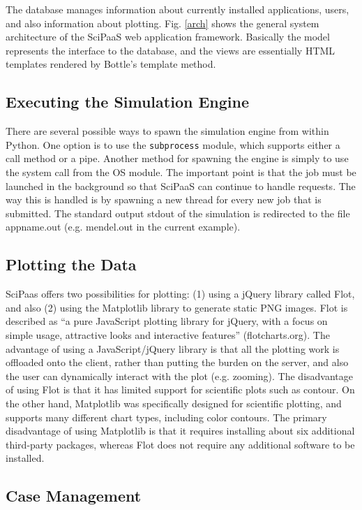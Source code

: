 \documentclass[10pt,reprint]{socc14}
\begin{document}
The database manages information about currently installed applications, users, and also information about plotting.  Fig. \ref{arch} shows the general system architecture of the SciPaaS web application framework. Basically the model represents the interface to the database, and the views are essentially HTML templates rendered by Bottle’s template method.

\subsection{Executing the Simulation Engine}

There are several possible ways to spawn the simulation engine from within Python.  One option is to use the \texttt{subprocess} module, which supports either a call method or a pipe.  Another method for spawning the engine is simply to use the system call from the OS module.  The important point is that the job must be launched in the background so that SciPaaS can continue to handle requests.  The way this is handled is by spawning a new thread for every new job that is submitted. The standard output stdout of the simulation is redirected to the file appname.out (e.g. mendel.out in the current example).

\subsection{Plotting the Data}

SciPaas offers two possibilities for plotting: (1) using a jQuery library called Flot, and also (2) using the Matplotlib library to generate static PNG images. Flot is described as “a pure JavaScript plotting library for jQuery, with a focus on simple usage, attractive looks and interactive features”  (flotcharts.org).  The advantage of using a JavaScript/jQuery library is that all the plotting work is offloaded onto the client, rather than putting the burden on the server, and also the user can dynamically interact with the plot (e.g. zooming).  The disadvantage of using Flot is that it has limited support for scientific plots such as contour.  On the other hand, Matplotlib was specifically designed for scientific plotting, and supports many different chart types, including color contours.  The primary disadvantage of using Matplotlib is that it requires installing about six additional third-party packages, whereas Flot does not require any additional software to be installed.

\subsection{Case Management}
\end{document}
